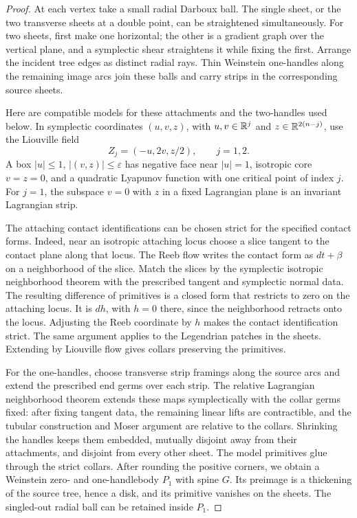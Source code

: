 \begin{proof}
At each vertex take a small radial Darboux ball.  The single sheet,
or the two transverse sheets at a double point, can be straightened
simultaneously.  For two sheets, first make one horizontal; the other
is a gradient graph over the vertical plane, and a symplectic shear
straightens it while fixing the first.  Arrange the incident tree
edges as distinct radial rays.  Thin Weinstein one-handles along the
remaining image arcs join these balls and carry strips in the
corresponding source sheets.

Here are compatible models for these attachments and the two-handles
used below.  In symplectic coordinates $(u,v,z)$, with
$u,v\in\mathbb R^j$ and $z\in\mathbb R^{2(n-j)}$, use the Liouville field
\begin{equation}\label{topo:handle-field}
 Z_j=(-u,2v,z/2),\qquad j=1,2.
\end{equation}
A box $|u|\leq1$, $|(v,z)|\leq\varepsilon$ has negative face near
$|u|=1$, isotropic core $v=z=0$, and a quadratic Lyapunov function
with one critical point of index $j$.  For $j=1$, the subspace
$v=0$ with $z$ in a fixed Lagrangian plane is an invariant
Lagrangian strip.

The attaching contact identifications can be chosen strict for the
specified contact forms.  Indeed, near an isotropic attaching locus
choose a slice tangent to the contact plane along that locus.
The Reeb flow writes the contact form as $dt+\beta$ on a
neighborhood of the slice.  Match the slices by the symplectic
isotropic neighborhood theorem with the prescribed tangent and
symplectic normal data.  The resulting difference of primitives is
a closed form that restricts to zero on the attaching locus.
It is $dh$, with $h=0$ there, since the neighborhood retracts onto
the locus.  Adjusting the Reeb coordinate by $h$ makes the contact
identification strict.  The same argument applies to the Legendrian
patches in the sheets.  Extending by Liouville flow gives collars
preserving the primitives.

For the one-handles, choose transverse strip framings along the
source arcs and extend the prescribed end germs over each strip.
The relative Lagrangian neighborhood theorem extends these maps
symplectically with the collar germs fixed: after fixing tangent
data, the remaining linear lifts are contractible, and the tubular
construction and Moser argument are relative to the collars.
Shrinking the handles keeps them embedded, mutually disjoint away
from their attachments, and disjoint from every other sheet.
The model primitives glue through the strict collars.  After
rounding the positive corners, we obtain a Weinstein zero- and
one-handlebody $P_1$ with spine $G$.  Its preimage is a thickening
of the source tree, hence a disk, and its primitive vanishes on the
sheets.  The singled-out radial ball can be retained inside $P_1$.


\end{proof}
